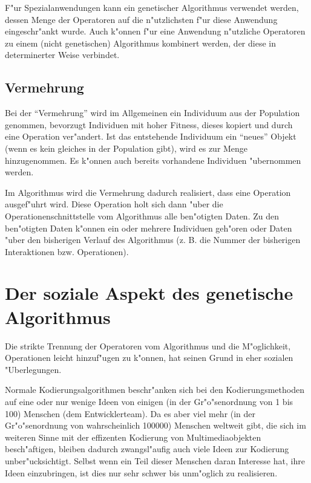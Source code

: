 F"ur Spezialanwendungen kann ein genetischer Algorithmus verwendet werden, dessen Menge der Operatoren auf die n"utzlichsten f"ur diese Anwendung eingeschr"ankt wurde.
Auch k"onnen f"ur eine Anwendung n"utzliche Operatoren zu einem (nicht genetischen) Algorithmus kombinert werden, der diese in determinerter Weise verbindet.


\subsection{Vermehrung}

Bei der ``Vermehrung'' wird im Allgemeinen ein Individuum aus der Population genommen, bevorzugt Individuen mit hoher Fitness, dieses kopiert und durch eine Operation ver"andert. Ist das entstehende Individuum ein ``neues'' Objekt (wenn es kein gleiches in der Population gibt), wird es zur Menge hinzugenommen. Es k"onnen auch bereits vorhandene Individuen "ubernommen werden.

Im Algorithmus wird die Vermehrung dadurch realisiert, dass eine Operation ausgef"uhrt wird. Diese Operation holt sich dann "uber die Operationenschnittstelle vom Algorithmus alle ben"otigten Daten. Zu den ben"otigten Daten k"onnen ein oder mehrere Individuen geh"oren oder Daten "uber den bisherigen Verlauf des Algorithmus (z. B. die Nummer der bisherigen Interaktionen bzw. Operationen).


\section{Der soziale Aspekt des genetische Algorithmus}

Die strikte Trennung der Operatoren vom Algorithmus und die M"oglichkeit, Operationen leicht hinzuf"ugen zu k"onnen, hat seinen Grund in eher sozialen "Uberlegungen.

Normale Kodierungsalgorithmen beschr"anken sich bei den Kodierungsmethoden auf eine oder nur wenige Ideen von einigen (in der Gr"o"senordnung von 1 bis 100) Menschen (dem Entwicklerteam). Da es aber viel mehr (in der Gr"o"senordnung von wahrscheinlich 100000) Menschen weltweit gibt, die sich im weiteren Sinne mit der effizenten Kodierung von Multimediaobjekten besch"aftigen, bleiben dadurch zwangsl"aufig auch viele Ideen zur Kodierung unber"ucksichtigt. Selbst wenn ein Teil dieser Menschen daran Interesse hat, ihre Ideen einzubringen, ist dies nur sehr schwer bis unm"oglich zu realisieren.

